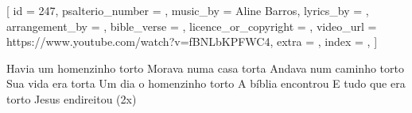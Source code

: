 
[
    id                     = {247},
    psalterio_number       = {},
    music_by               = {Aline Barros},
    lyrics_by              = {},
    arrangement_by         = {},
    bible_verse            = {},
    licence_or_copyright   = {},
    video_url              = {https://www.youtube.com/watch?v=fBNLbKPFWC4}, %
    extra                  = {},
    index                  = {},
]


\beginchorus

Havia um homenzinho torto 
Morava numa casa torta 
Andava num caminho torto 
Sua vida era torta
Um dia o homenzinho torto 
A bíblia encontrou
E tudo que era torto
Jesus endireitou
(2x)
\endchorus


\endsong
